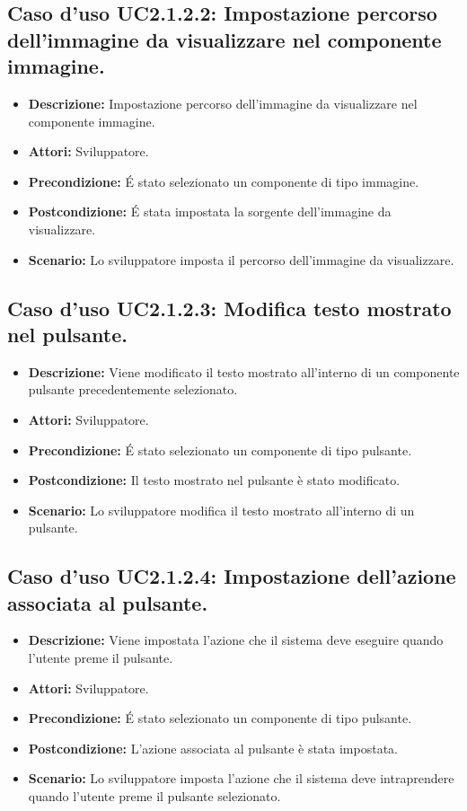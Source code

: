\subsection{Caso d'uso UC2.1.2.2: Impostazione percorso dell'immagine da visualizzare nel componente immagine.}
\begin{itemize}
\item[]\textbf{Descrizione:} Impostazione percorso dell'immagine da visualizzare nel componente immagine.
\item[]\textbf{Attori:} Sviluppatore. 
\item[]\textbf{Precondizione:} \'E stato selezionato un componente di tipo immagine. 
\item[]\textbf{Postcondizione:} \'E stata impostata la sorgente dell'immagine da visualizzare. 
\item[]\textbf{Scenario:}
 Lo sviluppatore imposta il percorso dell'immagine da visualizzare. 
\end{itemize}

\subsection{Caso d'uso UC2.1.2.3: Modifica testo mostrato nel pulsante.}
\begin{itemize}
\item[]\textbf{Descrizione:} Viene modificato il testo mostrato all'interno di un componente pulsante precedentemente selezionato.
\item[]\textbf{Attori:} Sviluppatore. 
\item[]\textbf{Precondizione:} \'E stato selezionato un componente di tipo pulsante. 
\item[]\textbf{Postcondizione:} Il testo mostrato nel pulsante è stato modificato. 
\item[]\textbf{Scenario:}
Lo sviluppatore modifica il testo mostrato all'interno di un pulsante. 
\end{itemize}

\subsection{Caso d'uso UC2.1.2.4: Impostazione dell'azione associata al pulsante.}
\begin{itemize}
\item[]\textbf{Descrizione:} Viene impostata l'azione che il sistema deve eseguire quando l'utente preme il pulsante.
\item[]\textbf{Attori:} Sviluppatore. 
\item[]\textbf{Precondizione:} \'E stato selezionato un componente di tipo pulsante. 
\item[]\textbf{Postcondizione:} L'azione associata al pulsante è stata impostata. 
\item[]\textbf{Scenario:}
Lo sviluppatore imposta l'azione che il sistema deve intraprendere quando l'utente preme il pulsante selezionato. 
\end{itemize}

